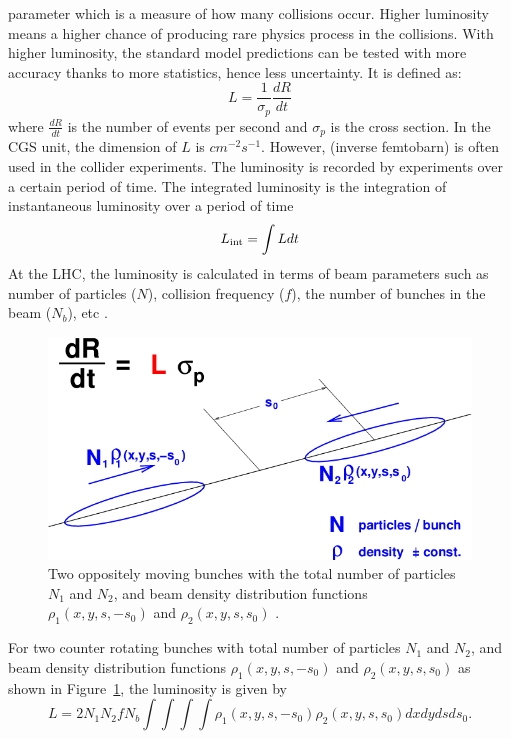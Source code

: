 \begin{itemize}[leftmargin=*]
	parameter which is a measure of how many collisions occur.
	Higher luminosity means a higher chance of producing rare physics process in the
	collisions. With higher luminosity, the standard model predictions can be tested
	with more accuracy thanks to more statistics, hence less uncertainty. It is defined as:  
	\begin{equation}
		L = \frac{1}{\sigma_p}\frac{dR}{dt}
	\end {equation}
	where $\frac{dR}{dt}$ is the number of events per second and $\sigma_p$ is the cross section.
	In the \rm{CGS} unit, the dimension of $L$ is $\unit{cm}^{-2} \unit{s}^{-1}$. However,
	\fbinv (inverse femtobarn) is often used in the collider experiments.
	The luminosity is recorded by experiments over a certain period of time. The
	integrated luminosity is the integration of instantaneous luminosity over a period of time
	\begin{equation}
		L_{\rm{int}} =  \int L dt
	\end{equation}
	At the LHC, the luminosity is calculated in terms of beam parameters such as number of
	particles ($N$), collision frequency ($f$), the number of bunches in the beam ($N_b$), 
	etc \cite{Herr:941318}. 
	\begin{figure}
	  \begin{center}
	  \includegraphics[width=0.50\linewidth]{Experiment/LHC/Image/lhc_lumi.png}
	  \caption{Two oppositely moving bunches with the total number of particles $N_1$ and
		  $N_2$, and beam density distribution functions $\rho_1(x, y, s, -s_0)$ and 
		  $\rho_2(x, y, s, s_0)$
		  \cite{Herr:941318}.}
	  \label{fig:lhc_lumi_rho}
	\end{center}
	\end{figure}
	For two counter rotating bunches with total number of particles 
	$N_1$ and $N_2$, and beam density distribution functions $\rho_1(x, y, s, -s_0)$ and 
	$\rho_2(x, y, s, s_0)$ as shown in Figure~\ref{fig:lhc_lumi_rho}, the luminosity is given 
	by~\cite{Herr:941318} 
	\begin{equation}
		L =  2N_1N_2fN_b\int\int\int\int \rho_1(x, y, s, -s_0) 
		\rho_2(x, y, s, s_0) dxdydsds_0.
	\label{eq:lhc_lumi1}

\end{equation}
\end{itemize}
